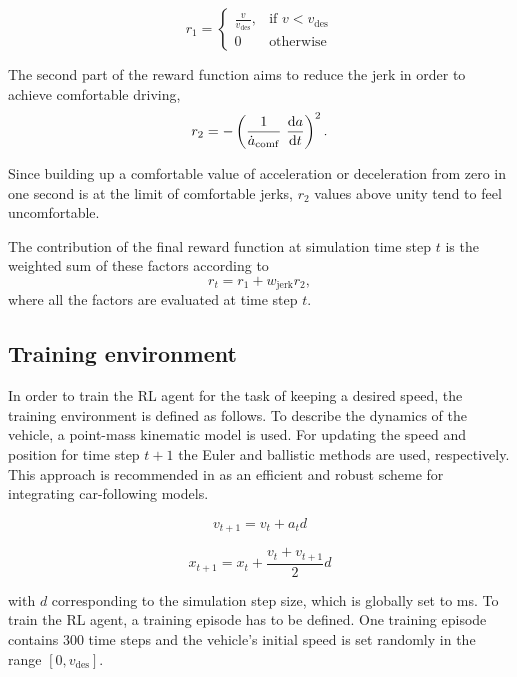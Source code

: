 \documentclass[review]{elsarticle}
\providecommand{\sub}[1]{_{\mathrm{#1}}}  %
\providecommand{\3}{{\ss}}
\begin{document}
\begin{equation}
	r_1  = 
	\begin{cases}
	\frac{v}{v\sub{des}},
	& \text{if } v < v\sub{des}\\
	0
	 & \text{otherwise}
	\end{cases}
\end{equation}

The second part of the reward function aims to reduce the jerk in
order to achieve comfortable driving, 
\begin{equation}
r_2 = -\left(\frac{1}{\dot{a}\sub{comf}} \ \dv{a}{t}\right)^2.
\end{equation}

Since building up a comfortable value of acceleration or deceleration
from zero in one second is at the limit of comfortable jerks, $r_2$
values above unity tend to feel uncomfortable.


The contribution of the final reward function at simulation time step $t$ is the weighted
sum of these factors according to
\begin{equation}
\label{rt1}
r_t =r_1 + w\sub{jerk} r_2,
\end{equation}
where all the factors are evaluated at time step $t$. 


\subsection{Training environment}
\label{training_environment1}
In order to train the RL agent for the task of keeping a desired
speed, the training environment is defined as follows. To describe the
dynamics of the vehicle, a point-mass kinematic model is used. For
updating the speed and position for time step $t + 1$ the Euler and
ballistic methods are used, respectively. This approach is recommended in \cite{numericalUpdateMethodsTreiber} as an efficient
and robust scheme for integrating car-following models.

\begin{equation}
	v_{t+1} = v_{t} + a_{t} d
\end{equation}

\begin{equation}
x_{t+1} = x_{t} + \frac{v_{t} + v_{t+1}}{2} d
\end{equation}


with $d$ corresponding to the simulation step size, which is globally
set to \unit[100]{ms}. To train the RL agent, a training episode has to be defined. One training episode contains 300 time steps and the vehicle's initial speed is set randomly in the range $[0,v\sub{des}]$.
\end{document}
